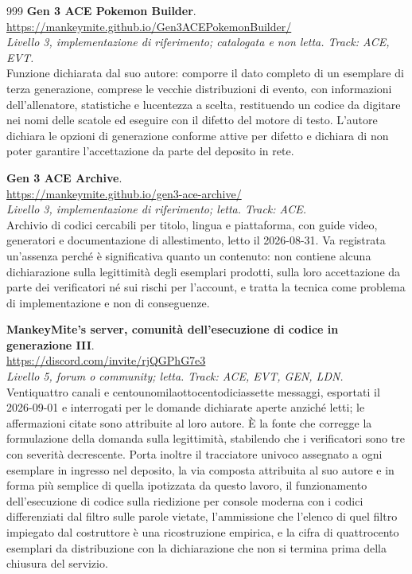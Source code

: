 \begin{thebibliography}{999}
  \textbf{Gen 3 ACE Pokemon Builder}.
  \\ \url{https://mankeymite.github.io/Gen3ACEPokemonBuilder/}
  \\ \emph{Livello 3, implementazione di riferimento; catalogata e non letta. Track: ACE, EVT.}
  \\ Funzione dichiarata dal suo autore: comporre il dato completo di un esemplare di terza generazione, comprese le vecchie distribuzioni di evento, con informazioni dell'allenatore, statistiche e lucentezza a scelta, restituendo un codice da digitare nei nomi delle scatole ed eseguire con il difetto del motore di testo. L'autore dichiara le opzioni di generazione conforme attive per difetto e dichiara di non poter garantire l'accettazione da parte del deposito in rete.

  \textbf{Gen 3 ACE Archive}.
  \\ \url{https://mankeymite.github.io/gen3-ace-archive/}
  \\ \emph{Livello 3, implementazione di riferimento; letta. Track: ACE.}
  \\ Archivio di codici cercabili per titolo, lingua e piattaforma, con guide video, generatori e documentazione di allestimento, letto il 2026-08-31. Va registrata un'assenza perché è significativa quanto un contenuto: non contiene alcuna dichiarazione sulla legittimità degli esemplari prodotti, sulla loro accettazione da parte dei verificatori né sui rischi per l'account, e tratta la tecnica come problema di implementazione e non di conseguenze.

  \textbf{MankeyMite's server, comunità dell'esecuzione di codice in generazione III}.
  \\ \url{https://discord.com/invite/rjQGPhG7e3}
  \\ \emph{Livello 5, forum o community; letta. Track: ACE, EVT, GEN, LDN.}
  \\ Ventiquattro canali e centounomilaottocentodiciassette messaggi, esportati il 2026-09-01 e interrogati per le domande dichiarate aperte anziché letti; le affermazioni citate sono attribuite al loro autore. È la fonte che corregge la formulazione della domanda sulla legittimità, stabilendo che i verificatori sono tre con severità decrescente. Porta inoltre il tracciatore univoco assegnato a ogni esemplare in ingresso nel deposito, la via composta attribuita al suo autore e in forma più semplice di quella ipotizzata da questo lavoro, il funzionamento dell'esecuzione di codice sulla riedizione per console moderna con i codici differenziati dal filtro sulle parole vietate, l'ammissione che l'elenco di quel filtro impiegato dal costruttore è una ricostruzione empirica, e la cifra di quattrocento esemplari da distribuzione con la dichiarazione che non si termina prima della chiusura del servizio.


\end{thebibliography}
